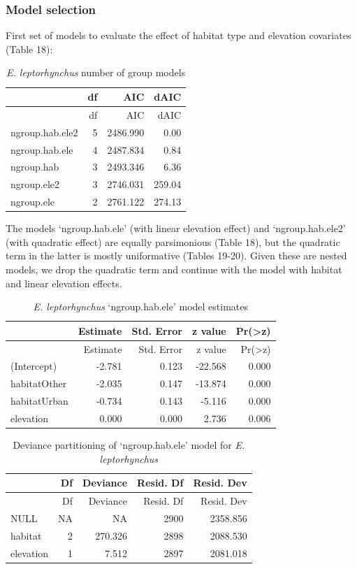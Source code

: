 \documentclass[]{article}
\begin{document}
\subsubsection{Model selection}\label{model-selection-1}

First set of models to evaluate the effect of habitat type and elevation
covariates (Table 18):

\begin{longtable}[]{@{}lrrr@{}}
\caption{\textit{E. leptorhynchus} number of group
models}\tabularnewline
\toprule
& df & AIC & dAIC\tabularnewline
\midrule
\endfirsthead
\toprule
& df & AIC & dAIC\tabularnewline
\midrule
\endhead
ngroup.hab.ele2 & 5 & 2486.990 & 0.00\tabularnewline
ngroup.hab.ele & 4 & 2487.834 & 0.84\tabularnewline
ngroup.hab & 3 & 2493.346 & 6.36\tabularnewline
ngroup.ele2 & 3 & 2746.031 & 259.04\tabularnewline
ngroup.ele & 2 & 2761.122 & 274.13\tabularnewline
\bottomrule
\end{longtable}

The models `ngroup.hab.ele' (with linear elevation effect) and
`ngroup.hab.ele2' (with quadratic effect) are equally parsimonious
(Table 18), but the quadratic term in the latter is mostly uniformative
(Tables 19-20). Given these are nested models, we drop the quadratic
term and continue with the model with habitat and linear elevation
effects.

\begin{longtable}[]{@{}lrrrr@{}}
\caption{\textit{E. leptorhynchus} `ngroup.hab.ele' model
estimates}\tabularnewline
\toprule
& Estimate & Std. Error & z value &
Pr(\textgreater{}\textbar{}z\textbar{})\tabularnewline
\midrule
\endfirsthead
\toprule
& Estimate & Std. Error & z value &
Pr(\textgreater{}\textbar{}z\textbar{})\tabularnewline
\midrule
\endhead
(Intercept) & -2.781 & 0.123 & -22.568 & 0.000\tabularnewline
habitatOther & -2.035 & 0.147 & -13.874 & 0.000\tabularnewline
habitatUrban & -0.734 & 0.143 & -5.116 & 0.000\tabularnewline
elevation & 0.000 & 0.000 & 2.736 & 0.006\tabularnewline
\bottomrule
\end{longtable}

\begin{longtable}[]{@{}lrrrr@{}}
\caption{Deviance partitioning of `ngroup.hab.ele' model for
\textit{E. leptorhynchus}}\tabularnewline
\toprule
& Df & Deviance & Resid. Df & Resid. Dev\tabularnewline
\midrule
\endfirsthead
\toprule
& Df & Deviance & Resid. Df & Resid. Dev\tabularnewline
\midrule
\endhead
NULL & NA & NA & 2900 & 2358.856\tabularnewline
habitat & 2 & 270.326 & 2898 & 2088.530\tabularnewline
elevation & 1 & 7.512 & 2897 & 2081.018\tabularnewline
\bottomrule
\end{longtable}
\end{document}
